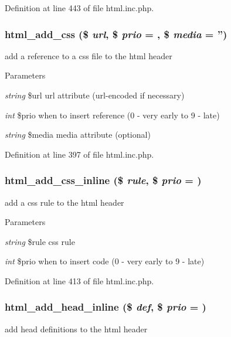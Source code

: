 Definition at line 443 of file html.inc.php.

\hypertarget{html_8inc_8php_a962ef1b29e909a38b9a7b79086d54ab2}{
\subsubsection[{html\_\-add\_\-css}]{\setlength{\rightskip}{0pt plus 5cm}html\_\-add\_\-css (\$ {\em url}, \/  \$ {\em prio} = {}, \/  \$ {\em media} = {\ttfamily ''})}}
\label{html_8inc_8php_a962ef1b29e909a38b9a7b79086d54ab2}
add a reference to a css file to the html header


\begin{DoxyParams}{Parameters}
\item[{\em string}]\$url url attribute (url-\/encoded if necessary) \item[{\em int}]\$prio when to insert reference (0 -\/ very early to 9 -\/ late) \item[{\em string}]\$media media attribute (optional) \end{DoxyParams}


Definition at line 397 of file html.inc.php.

\hypertarget{html_8inc_8php_aae42f14c51b89215ad79b303ecb6e9e9}{
\subsubsection[{html\_\-add\_\-css\_\-inline}]{\setlength{\rightskip}{0pt plus 5cm}html\_\-add\_\-css\_\-inline (\$ {\em rule}, \/  \$ {\em prio} = {})}}
\label{html_8inc_8php_aae42f14c51b89215ad79b303ecb6e9e9}
add a css rule to the html header


\begin{DoxyParams}{Parameters}
\item[{\em string}]\$rule css rule \item[{\em int}]\$prio when to insert code (0 -\/ very early to 9 -\/ late) \end{DoxyParams}


Definition at line 413 of file html.inc.php.

\hypertarget{html_8inc_8php_a3c3f439a358951694d2280124bd6e2b9}{
\subsubsection[{html\_\-add\_\-head\_\-inline}]{\setlength{\rightskip}{0pt plus 5cm}html\_\-add\_\-head\_\-inline (\$ {\em def}, \/  \$ {\em prio} = {})}}
\label{html_8inc_8php_a3c3f439a358951694d2280124bd6e2b9}
add head definitions to the html header


